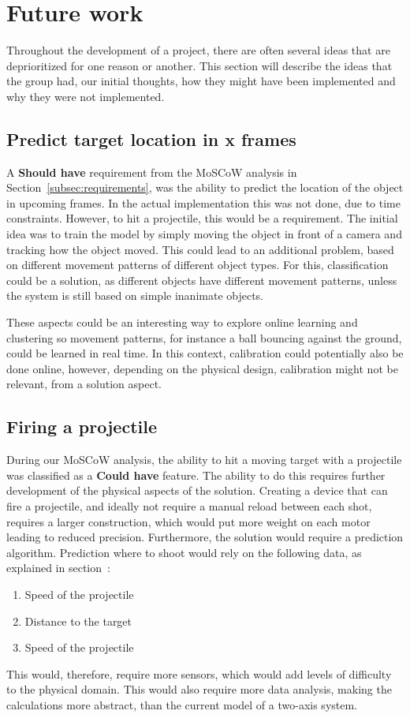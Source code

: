 \section{Future work}\label{sec:futurework}
Throughout the development of a project, there are often several ideas that are deprioritized for one reason or another.
This section will describe the ideas that the group had, our initial thoughts, how they might have been implemented and why they were not implemented.


\subsection{Predict target location in x frames}
A \textbf{Should have} requirement from the MoSCoW analysis in Section~\ref{subsec:requirements}, was the ability to predict the location of the object in upcoming frames.
In the actual implementation this was not done, due to time constraints.
However, to hit a projectile, this would be a requirement.
The initial idea was to train the model by simply moving the object in front of a camera and tracking how the object moved.
This could lead to an additional problem, based on different movement patterns of different object types.
For this, classification could be a solution, as different objects have different movement patterns, unless the system is still based on simple inanimate objects.

These aspects could be an interesting way to explore online learning and clustering so movement patterns, for instance a ball bouncing against the ground, could be learned in real time. 
In this context, calibration could potentially also be done online, however, depending on the physical design, calibration might not be relevant, from a solution aspect.



\subsection{Firing a projectile}
During our MoSCoW analysis, the ability to hit a moving target with a projectile was classified as a \textbf{Could have} feature.
The ability to do this requires further development of the physical aspects of the solution.
Creating a device that can fire a projectile, and ideally not require a manual reload between each shot, requires a larger construction, which would put more weight on each motor leading to reduced precision.
Furthermore, the solution would require a prediction algorithm.
Prediction where to shoot would rely on the following data, as explained in section~:
\begin{enumerate}
	\item Speed of the projectile
	\item Distance to the target
	\item Speed of the projectile
\end{enumerate}
This would, therefore, require more sensors, which would add levels of difficulty to the physical domain.
This would also require more data analysis, making the calculations more abstract, than the current model of a two-axis system.


